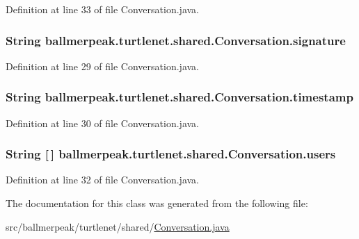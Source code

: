 Definition at line 33 of file Conversation.\-java.

\hypertarget{classballmerpeak_1_1turtlenet_1_1shared_1_1Conversation_a27bf5eadc5e4a46d79125a2c6b7be9f8}{
\subsubsection[{signature}]{\setlength{\rightskip}{0pt plus 5cm}String ballmerpeak.\-turtlenet.\-shared.\-Conversation.\-signature}}\label{classballmerpeak_1_1turtlenet_1_1shared_1_1Conversation_a27bf5eadc5e4a46d79125a2c6b7be9f8}


Definition at line 29 of file Conversation.\-java.

\hypertarget{classballmerpeak_1_1turtlenet_1_1shared_1_1Conversation_a4b23ef60e0fef247b74eeba61a85036f}{
\subsubsection[{timestamp}]{\setlength{\rightskip}{0pt plus 5cm}String ballmerpeak.\-turtlenet.\-shared.\-Conversation.\-timestamp}}\label{classballmerpeak_1_1turtlenet_1_1shared_1_1Conversation_a4b23ef60e0fef247b74eeba61a85036f}


Definition at line 30 of file Conversation.\-java.

\hypertarget{classballmerpeak_1_1turtlenet_1_1shared_1_1Conversation_a83edd678b2620b5487fb9a93d52b285e}{
\subsubsection[{users}]{\setlength{\rightskip}{0pt plus 5cm}String \mbox{[}$\,$\mbox{]} ballmerpeak.\-turtlenet.\-shared.\-Conversation.\-users}}\label{classballmerpeak_1_1turtlenet_1_1shared_1_1Conversation_a83edd678b2620b5487fb9a93d52b285e}


Definition at line 32 of file Conversation.\-java.



The documentation for this class was generated from the following file\-:\begin{DoxyCompactItemize}
\item 
src/ballmerpeak/turtlenet/shared/\hyperlink{Conversation_8java}{Conversation.\-java}\end{DoxyCompactItemize}
